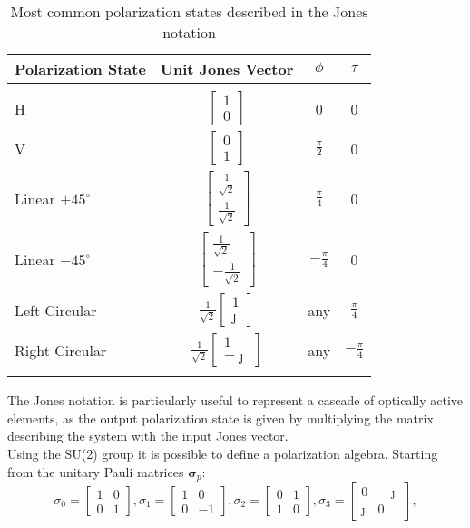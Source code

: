 \documentclass[11pt]{article}
\begin{document}
\begin{table}
	\centering
	\begin{tabular}{lccc}
		Polarization State & Unit Jones Vector & $\phi$ & $\tau$\\
		\hline				\\
		H & $\begin{bmatrix}1 \\ 0 \end{bmatrix}$ & 0 & 0 \\
		\addlinespace[1.5ex]
		V & $\begin{bmatrix}0 \\ 1 \end{bmatrix}$ & $\frac{\pi}{2}$ & 0 \\
		\addlinespace[1.5ex]
		Linear $+45^{\circ}$ & $\begin{bmatrix}\frac{1}{\sqrt{2}} \\ \frac{1}{\sqrt{2}} \end{bmatrix}$	
		& $\frac{\pi}{4}$ & 0\\
		\addlinespace[1.5ex]
		Linear $-45^{\circ}$ & $\begin{bmatrix}\frac{1}{\sqrt{2}} \\ -\frac{1}{\sqrt{2}} \end{bmatrix}$	
		& $-\frac{\pi}{4}$ & 0\\
		Left Circular & $\frac{1}{\sqrt{2}}\begin{bmatrix}1 \\ \jmath \end{bmatrix}$ & any & $\frac{\pi}{4}$\\
		\addlinespace[1.5ex]
		Right Circular & $\frac{1}{\sqrt{2}}\begin{bmatrix}1 \\ -\jmath \end{bmatrix}$ & any & $-\frac{\pi}{4}$\\
		\addlinespace[1.5ex]
		\hline
	\end{tabular}
	\caption{Most common polarization states described in the Jones notation}
\end{table}
The Jones notation is particularly useful to represent a cascade of optically active elements, as the output polarization state is given by multiplying the matrix describing the system with the input Jones vector.\\
Using the SU(2) group it is possible to define a polarization algebra. Starting from the unitary Pauli matrices $\boldsymbol\sigma_{p}$:
\begin{equation}
	\sigma_{0}=\begin{bmatrix}1 & 0 \\ 0 & 1\end{bmatrix},
	\sigma_{1}=\begin{bmatrix}1 & 0 \\ 0 & -1\end{bmatrix},
	\sigma_{2}=\begin{bmatrix}0 & 1 \\ 1 & 0\end{bmatrix},
	\sigma_{3}=\begin{bmatrix}0 & -\jmath \\ \jmath & 0\end{bmatrix},
\end{equation}
\end{document}

